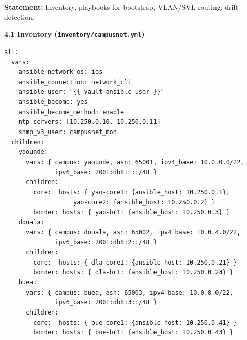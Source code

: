 \documentclass[11pt]{article}
\begin{document}
\begin{exoresolu}
\textbf{Statement:} Inventory, playbooks for bootstrap, VLAN/SVI, routing, drift detection.

\tcblower
\textbf{4.1 Inventory (\texttt{inventory/campusnet.yml})}\par
\texttt{all:}\\
\texttt{\ \ vars:}\\
\texttt{\ \ \ \ ansible\_network\_os: ios}\\
\texttt{\ \ \ \ ansible\_connection: network\_cli}\\
\texttt{\ \ \ \ ansible\_user: "\{\{ vault\_ansible\_user \}\}"}\\
\texttt{\ \ \ \ ansible\_become: yes}\\
\texttt{\ \ \ \ ansible\_become\_method: enable}\\
\texttt{\ \ \ \ ntp\_servers: [10.250.0.10, 10.250.0.11]}\\
\texttt{\ \ \ \ snmp\_v3\_user: campusnet\_mon}\\
\texttt{\ \ children:}\\
\texttt{\ \ \ \ yaounde:}\\
\texttt{\ \ \ \ \ \ vars: \{ campus: yaounde, asn: 65001, ipv4\_base: 10.0.0.0/22,}\\
\texttt{\ \ \ \ \ \ \ \ \ \ \ \ \ \ ipv6\_base: 2001:db8:1::/48 \}}\\
\texttt{\ \ \ \ \ \ children:}\\
\texttt{\ \ \ \ \ \ \ \ core:\ \ hosts: \{ yao-core1: \{ansible\_host: 10.250.0.1\},}\\
\texttt{\ \ \ \ \ \ \ \ \ \ \ \ \ \ \ \ \ \ \ yao-core2: \{ansible\_host: 10.250.0.2\} \}}\\
\texttt{\ \ \ \ \ \ \ \ border: hosts: \{ yao-br1: \{ansible\_host: 10.250.0.3\} \}}\\
\texttt{\ \ \ \ douala:}\\
\texttt{\ \ \ \ \ \ vars: \{ campus: douala, asn: 65002, ipv4\_base: 10.0.4.0/22,}\\
\texttt{\ \ \ \ \ \ \ \ \ \ \ \ \ \ ipv6\_base: 2001:db8:2::/48 \}}\\
\texttt{\ \ \ \ \ \ children:}\\
\texttt{\ \ \ \ \ \ \ \ core:\ \ hosts: \{ dla-core1: \{ansible\_host: 10.250.0.21\} \}}\\
\texttt{\ \ \ \ \ \ \ \ border: hosts: \{ dla-br1: \{ansible\_host: 10.250.0.23\} \}}\\
\texttt{\ \ \ \ buea:}\\
\texttt{\ \ \ \ \ \ vars: \{ campus: buea, asn: 65003, ipv4\_base: 10.0.8.0/22,}\\
\texttt{\ \ \ \ \ \ \ \ \ \ \ \ \ \ ipv6\_base: 2001:db8:3::/48 \}}\\
\texttt{\ \ \ \ \ \ children:}\\
\texttt{\ \ \ \ \ \ \ \ core:\ \ hosts: \{ bue-core1: \{ansible\_host: 10.250.0.41\} \}}\\
\texttt{\ \ \ \ \ \ \ \ border: hosts: \{ bue-br1: \{ansible\_host: 10.250.0.43\} \}}


\end{exoresolu}
\end{document}
